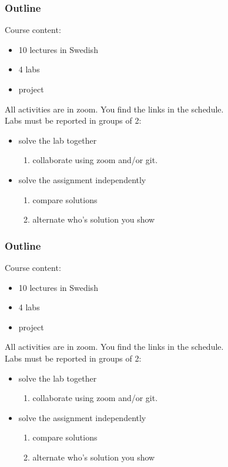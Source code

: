 \documentclass[aspectratio=1610]{beamer}
\begin{document}
\begin{frame}
  \frametitle{Outline}
Course content:
\begin{itemize}
\item 10 lectures in Swedish
\item 4 labs
\item project
\end{itemize}
\vspace{2mm}
All activities are in zoom. You find the links in the schedule.
\\ \vspace{2mm}
Labs must be reported in groups of 2:
\begin{itemize}
 \item solve the lab together
    \begin{enumerate}
      \item collaborate using zoom and/or git.
   \end{enumerate}
 \item solve the assignment independently
   \begin{enumerate}
     \item compare solutions
     \item alternate who's solution you show
   \end{enumerate}
\end{itemize}
\end{frame}

\begin{frame}
  \frametitle{Outline}
Course content:
\begin{itemize}
\item 10 lectures in Swedish
\item 4 labs
\item project
\end{itemize}
\vspace{2mm}
All activities are in zoom. You find the links in the schedule.
\\ \vspace{2mm}
Labs must be reported in groups of 2:
\begin{itemize}
 \item solve the lab together
    \begin{enumerate}
      \item collaborate using zoom and/or git.
   \end{enumerate}
 \item solve the assignment independently
   \begin{enumerate}
     \item compare solutions
     \item alternate who's solution you show
   \end{enumerate}
\end{itemize}
\end{frame}
\end{document}
